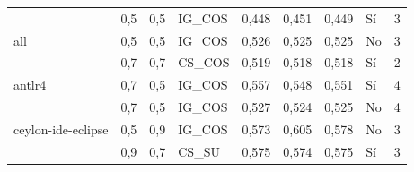 \begin{table}[H]
{{\begin{tabular}{lllllllll}
                                & 0,5                               & 0,5                            & IG\_COS                                     & 0,448                                  & 0,451                               & 0,449                                 & Sí                               & 3                                         \\
all                                  & 0,5                               & 0,5                            & IG\_COS                                     & 0,526                                  & 0,525                               & 0,525                                 & No                                   & 3                                         \\
                                  & 0,7                               & 0,7                            & CS\_COS                                     & 0,519                                  & 0,518                               & 0,518                                 & Sí                               & 2                                         \\
antlr4                               & 0,7                               & 0,5                            & IG\_COS                                     & 0,557                                  & 0,548                               & 0,551                                 & Sí                               & 4                                         \\
                               & 0,7                               & 0,5                            & IG\_COS                                     & 0,527                                  & 0,524                               & 0,525                                 & No                                   & 4                                         \\
ceylon-ide-eclipse                   & 0,5                               & 0,9                            & IG\_COS                                     & 0,573                                  & 0,605                               & 0,578                                 & No                                   & 3                                         \\
                  & 0,9                               & 0,7                            & CS\_SU                                      & 0,575                                  & 0,574                               & 0,575                                 & Sí                               & 3                                         \\

\end{tabular}}}
\end{table}
